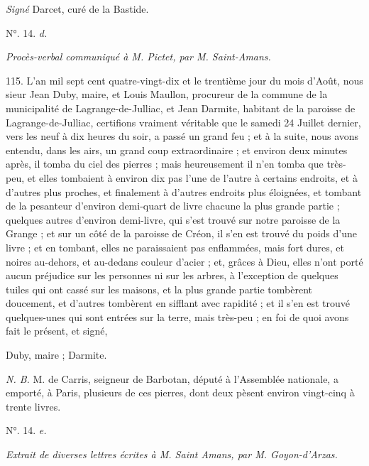 \documentclass[a4paper, 11pt, oneside, polutonikogreek, french]{article}
\begin{document}
\emph{Signé} Darcet, curé de la Bastide.

\begin{center}
N°. 14. \emph{d.}
\end{center}

\begin{center}
\emph{Procès-verbal communiqué à M. Pictet, par M. Saint-Amans.}
\end{center}

115. L'an mil sept cent quatre-vingt-dix et le trentième jour du mois d'Août, nous sieur Jean Duby, maire, et Louis Maullon, procureur de la commune de la municipalité de Lagrange-de-Julliac, et Jean Darmite, habitant de la paroisse de Lagrange-de-Julliac, certifions vraiment véritable que le samedi 24 Juillet dernier, vers les neuf à dix heures du soir, a passé un grand feu ; et à la suite, nous avons entendu, dans les airs, un grand coup extraordinaire ; et environ deux minutes après, il tomba du ciel des pierres ; mais heureusement il n'en tomba que très-peu, et elles tombaient à environ dix pas l'une de l'autre à certains endroits, et à d'autres plus proches, et finalement à d'autres endroits plus éloignées, et tombant de la pesanteur d'environ demi-quart de livre chacune la plus grande partie ; quelques autres d'environ demi-livre, qui s'est trouvé sur notre paroisse de la Grange ; et sur un côté de la paroisse de Créon, il s'en est trouvé du poids d'une livre ; et en tombant, elles ne paraissaient pas enflammées, mais fort dures, et noires au-dehors, et au-dedans couleur d'acier ; et, grâces à Dieu, elles n'ont porté aucun préjudice sur les personnes ni sur les arbres, à l'exception de quelques tuiles qui ont cassé sur les maisons, et la plus grande partie tombèrent doucement, et d'autres tombèrent en sifflant avec rapidité ; et il s'en est trouvé quelques-unes qui sont entrées sur la terre, mais très-peu ; en foi de quoi avons fait le présent, et signé,

Duby, maire ; Darmite.

\emph{N. B.} M. de Carris, seigneur de Barbotan, député à l'Assemblée nationale, a emporté, à Paris, plusieurs de ces pierres, dont deux pèsent environ vingt-cinq à trente livres.

\begin{center}
N°. 14. \emph{e.}
\end{center}

\begin{center}
\emph{Extrait de diverses lettres écrites à M. Saint Amans, par M. Goyon-d'Arzas.}
\end{center}
\end{document}

